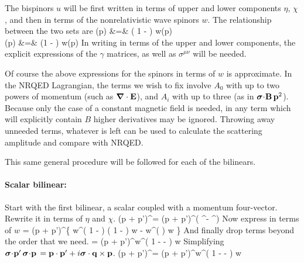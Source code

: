 The bispinors $u$ will be first written in terms of upper and lower components $\eta$, $\chi$, and then in terms of the nonrelativistic wave spinors $w$.  The relationship between the two sets are
\beqa
	\eta(p) &=& \left( 1 -  \right ) w(p)	\\
	\chi(p)	&=&  \left(1  -  \right ) w(p)
\eeqa
In writing in terms of the upper and lower components,  the explicit expressions of the $\gamma$ matrices, as well as $\sigma^{\mu\nu}$ will be needed.  

Of course the above expressions for the spinors in terms of $w$ is approximate.  In the NRQED Lagrangian, the terms we wish to fix involve $A_0$ with up to two powers of momentum (such as $\mbox{\boldmath$ \nabla $} \cdot \mathbf{E}$), and $A_i$ with up to three (as in $\mbox{\boldmath$ \sigma $} \hspace{-2pt} \cdot \hspace{-2pt} \mathbf{B} \, \mathbf{p}^2$).  Because only the case of a constant magnetic field is needed, in any term which will explicitly contain $B$ higher derivatives may be ignored.  Throwing away unneeded terms, whatever is left can be used to calculate the scattering amplitude and compare with NRQED.

This same general procedure will be followed for each of the bilinears.

\paragraph{Scalar bilinear:}
Start with the first bilinear, a scalar coupled with a momentum four-vector.  Rewrite it in terms of $\eta$ and $\chi$.
\beq
	(p + p')^\mu \srb \sr  = (p + p')^\mu \left( \eta^\dagger \eta - \chi^\dagger \chi \right ) 
\eeq
Now express in terms of $w$
\beq
	= (p + p')^\mu \left \{
		w^\dagger \left( 1 -  \right )  \left( 1 -  \right ) w
		- w^\dagger \left(   \right ) w \right \}
\eeq 
And finally drop terms beyond the order that we need.
\beq
	= (p + p')^\mu w^\dagger \left( 
		1 -   - \frac{ \gv{\sigma} \cdot \v{p'} \gv{\sigma} \cdot \v{p} }{4m^2} 
		\right ) w
\eeq
Simplifying $\mbox{\boldmath$ \sigma $} \hspace{-2pt} \cdot \hspace{-2pt} \mathbf{p'} \, \mbox{\boldmath$ \sigma $} \hspace{-2pt} \cdot \hspace{-2pt} \mathbf{p} \, = \mathbf{p} \cdot \mathbf{p'} + i\mbox{\boldmath$ \sigma $} \cdot \mathbf{q} \times \mathbf{p}$.
\beq \label{eq:Sh:Si}
	(p + p')^\mu \srb \sr  = (p + p')^\mu w^\dagger \left( 
		1 -   - \frac{i\gv{\sigma} \cdot \v{q} \times \v{p} }{4m^2} 
		\right ) w
\eeq

